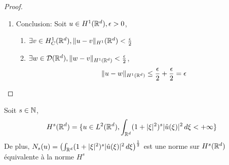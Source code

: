 \documentclass[]{report}
\begin{document}
\begin{proof}
\begin{enumerate}
            \[\norme{\widehat{\rho_n}-1}_{L^\infty(\R^d)}\toninfty 0\]
            Donc $\norme{v_n-v}_{L^2}\toninfty 0$. $\partial_j v_n=\rho_n*\partial_j v$, et on fait la même chose.
            \[\norme{\partial_j v_n -\partial_j v}_{L^2(\R^d)}\toninfty 0\]
            \item Conclusion: Soit $u\in H^1(\mathbb{R}^d),\epsilon>0$,
            \begin{enumerate}
                \item $\exists v\in H_C^1(\mathbb{R}^d),\lVert u-v \rVert_{H^1}(\mathbb{R}^d)<\frac{\epsilon}{2}$
                \item $\exists w\in \mathcal{D}(\mathbb{R}^d),\lVert w-v \rVert_{H^1(\mathbb{R}^d)}<\frac{\epsilon}{2}$,
                \[\lVert u-w \rVert_{H^1(\mathbb{R}^d)}\le \frac{\epsilon}{2}+ \frac{\epsilon}{2}=\epsilon\]
            \end{enumerate}
        \end{enumerate}
    \end{proof}

    \begin{tm}{}{}
        Soit $s\in \mathbb{N}$,
        \[H^s(\mathbb{R}^d)=\{u\in L^2(\mathbb{R}^d),\int_{\mathbb{R}^d}(1+|\xi|^2)^s|\hat{u}(\xi)|^2\, d\xi <+\infty\}\]
        De plus, $N_s(u)=\left(\int_{\mathbb{R}^d} (1+|\xi|^2)^s|\hat{u}(\xi)|^2\, d\xi \right)^{\frac{1}{2}}$ est une norme sur $H^s(\mathbb{R}^d)$ équivalente à la norme $H^s$
    \end{tm}
\end{document}
